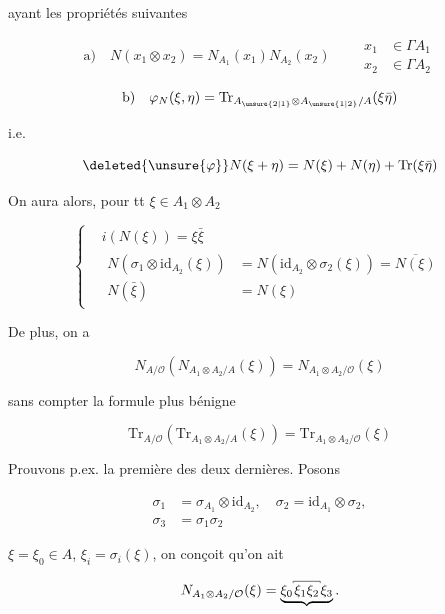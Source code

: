 
ayant les propriétés suivantes

\[
\text{a)}\quad N(x_1\otimes x_2)=N_{A_1}(x_1)N_{A_2}(x_2)
\qquad\begin{aligned}x_1&\in\Gamma A_1\\x_2&\in\Gamma A_2\end{aligned}
\]

\[
\text{b)}\quad\varphi_N(\xi,\eta)=\mathrm{Tr}_{A_{\unsure{2|1}}\otimes A_{\unsure{1|2}}/A}(\xi\bar\eta)
\]

 i.e.

\[
\deleted{\unsure{\varphi}}N(\xi+\eta)=N(\xi)+N(\eta)+\mathrm{Tr}(\xi\bar\eta)
\]

On aura alors, pour tt $\xi\in A_1\otimes A_2$

\[
\left\{\begin{aligned}
&\boxed{i(N(\xi))=\xi\bar\xi}\\
&\boxed{\begin{aligned}
N(\sigma_1\otimes\mathrm{id}_{A_2}(\xi))&=N(\mathrm{id}_{A_2}\otimes\sigma_2(\xi))=\overline{N(\xi)}\\
N(\bar\xi)&=N(\xi)
\end{aligned}}
\end{aligned}\right.
\]


De plus, on a

\[
\boxed{N_{A/\mathcal O}(N_{A_1\otimes A_2/A}(\xi))=N_{A_1\otimes A_2/\mathcal O}(\xi)}
\]

sans compter la formule plus bénigne

\[
\boxed{\mathrm{Tr}_{A/\mathcal O}(\mathrm{Tr}_{A_1\otimes A_2/A}(\xi))=\mathrm{Tr}_{A_1\otimes A_2/\mathcal O}(\xi)}
\]

Prouvons p.ex. la première des deux dernières.   Posons

\[
\begin{aligned}
\sigma_1&=\sigma_{A_1}\otimes\mathrm{id}_{A_2},\quad\sigma_2=\mathrm{id}_{A_1}\otimes\sigma_2,\\
\sigma_3&=\sigma_1\sigma_2
\end{aligned}
\]

 $\xi=\xi_0\in A$,  $\xi_i=\sigma_i(\xi)$, on conçoit qu'on ait

\[
N_{A_1\otimes A_2/\mathcal O}(\xi)=\underbrace{\xi_0\overset{\rule[-1.1pt]{.35pt}{1.5pt}\rule{1.9em}{.4pt}\rule[-1.1pt]{.35pt}{1.5pt}}{\xi_1\xi_2}\xi_3}.
\]



